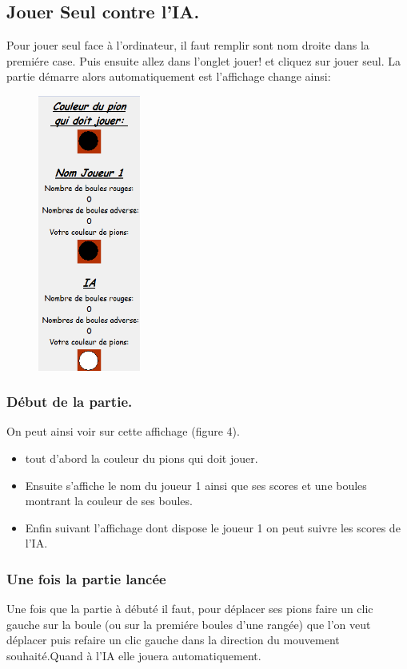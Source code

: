 \documentclass{article}
\begin{document}
\subsection{Jouer Seul contre l'IA.}
Pour jouer seul face à l'ordinateur, il faut remplir sont nom droite dans la premiére case. Puis ensuite allez dans l'onglet jouer! et cliquez sur jouer seul. La partie démarre alors automatiquement est l'affichage change ainsi:

\begin{figure}[!h]
\centerline{\includegraphics[width=0.3\textwidth]{images/Affichage_Jouer_seul.png}}
\vspace{0.5cm}
\caption{}
\end{figure}

\newpage{}

\subsubsection{Début de la partie.} On peut ainsi voir sur cette affichage (figure 4).
\begin{itemize}
\item tout d'abord la couleur du pions qui doit jouer.
\item Ensuite s'affiche le nom du joueur 1 ainsi que ses scores et une boules montrant la couleur de ses boules. 
\item Enfin suivant l'affichage dont dispose le joueur 1 on peut suivre les scores de l'IA.
\end{itemize}
\subsubsection{Une fois la partie lancée}
Une fois que la partie à débuté il faut, pour déplacer ses pions faire un clic gauche sur la boule (ou sur la premiére boules d'une rangée) que l'on veut déplacer puis refaire un clic gauche dans la direction du mouvement souhaité.Quand à l'IA elle jouera automatiquement.
\end{document}
